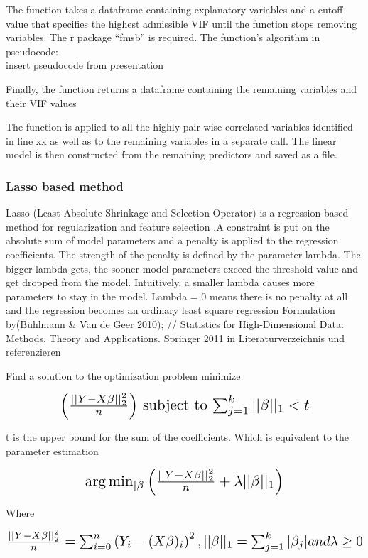 \documentclass[11pt]{article}
\begin{document}
The function takes a dataframe containing explanatory variables and a cutoff value that specifies the highest admissible VIF until the function stops removing variables. The r package “fmsb” is required.
The function’s algorithm in pseudocode:\\
insert pseudocode from presentation

Finally, the function returns a dataframe containing the remaining variables and their VIF values

The function is applied to all the highly pair-wise correlated variables identified in line xx as well as to the remaining variables in a separate call. The linear model is then constructed from the remaining predictors and saved as a file.

\subsubsection{Lasso based method}

Lasso (Least Absolute Shrinkage and Selection Operator) is a regression based method for regularization and feature selection .A constraint is put on the absolute sum of model parameters and a penalty is applied to the regression coefficients. The strength of the penalty is defined by the parameter lambda. The bigger lambda gets, the sooner model parameters exceed the threshold value and get dropped from the model. Intuitively, a smaller lambda causes more parameters to stay in the model. Lambda = 0 means there is no penalty at all and the regression becomes an ordinary least square regression
Formulation by(Bühlmann \& Van de Geer 2010); // Statistics for High-Dimensional Data: Methods, Theory and Applications.
Springer 2011 in Literaturverzeichnis und referenzieren

Find a solution to the optimization problem 
minimize 
\begin{center}  \[ \scalebox{1.5} {$\left ( \frac{||Y-X\beta ||^2_2}{n} \right )$ subject to  $\sum_{j=1}^{k} ||\beta ||_1<t$}\] \end{center} 

t is the upper bound for the sum of the coefficients.
Which is equivalent to the parameter estimation \\ 
\begin{center}  \[ \scalebox{1.5} {$\arg \min_{]\beta}\left (\frac{||Y-X\beta||_{2}^2}{n} +\lambda ||\beta ||_{1} \right ) $}\] \end{center} 

Where
\begin{center} \[ \scalebox{1.5} {$\frac{||Y-X\beta||_{2}^2}{n} = \sum _{i=0}^n\left ( Y_{i}-(X\beta)_{i} \right )^2, ||\beta||_{1}=\sum _{j=1}^k|\beta_{j}| and \lambda \geq 0 $}\]\end{center} 
\end{document}
